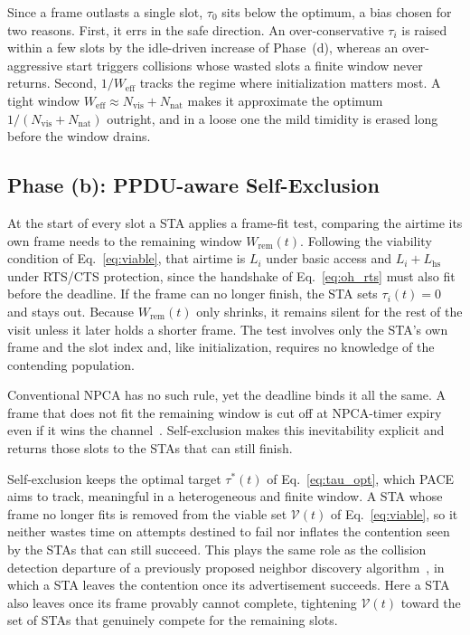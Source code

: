 \documentclass[journal,10pt]{IEEEtran}
\newcommand{\Nvis}{N_\mathrm{vis}}
\newcommand{\Nnat}{N_\mathrm{nat}}
\begin{document}
Since a frame outlasts a single slot, $\tau_0$ sits below the optimum, a bias chosen for two reasons. First, it errs in the safe direction. An over-conservative $\tau_i$ is raised within a few slots by the idle-driven increase of Phase~(d), whereas an over-aggressive start triggers collisions whose wasted slots a finite window never returns. Second, $1/W_\mathrm{eff}$ tracks the regime where initialization matters most. A tight window $W_\mathrm{eff}\!\approx\!\Nvis{+}\Nnat$ makes it approximate the optimum $1/(\Nvis{+}\Nnat)$ outright, and in a loose one the mild timidity is erased long before the window drains. 

\subsection{Phase (b): PPDU-aware Self-Exclusion}
\label{subsec:self_exclusion}

At the start of every slot a STA applies a frame-fit test, comparing the airtime its own frame needs to the remaining window $W_\mathrm{rem}(t)$. Following the viability condition of Eq.~\eqref{eq:viable}, that airtime is $L_i$ under basic access and $L_i+L_\mathrm{hs}$ under RTS/CTS protection, since the handshake of Eq.~\eqref{eq:oh_rts} must also fit before the deadline. If the frame can no longer finish, the STA sets $\tau_i(t)=0$ and stays out. Because $W_\mathrm{rem}(t)$ only shrinks, it remains silent for the rest of the visit unless it later holds a shorter frame. The test involves only the STA's own frame and the slot index and, like initialization, requires no knowledge of the contending population.

Conventional NPCA has no such rule, yet the deadline binds it all the same. A frame that does not fit the remaining window is cut off at NPCA-timer expiry even if it wins the channel~\cite{ieee80211bn}. Self-exclusion makes this inevitability explicit and returns those slots to the STAs that can still finish.

Self-exclusion keeps the optimal target $\tau^*(t)$ of Eq.~\eqref{eq:tau_opt}, which PACE aims to track, meaningful in a heterogeneous and finite window. A STA whose frame no longer fits is removed from the viable set $\mathcal{V}(t)$ of Eq.~\eqref{eq:viable}, so it neither wastes time on attempts destined to fail nor inflates the contention seen by the STAs that can still succeed. This plays the same role as the collision detection departure of a previously proposed neighbor discovery algorithm~\cite{song2014pnd}, in which a STA leaves the contention once its advertisement succeeds. Here a STA also leaves once its frame provably cannot complete, tightening $\mathcal{V}(t)$ toward the set of STAs that genuinely compete for the remaining slots.
\end{document}

